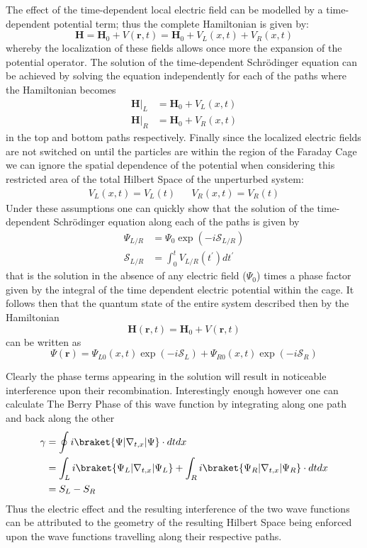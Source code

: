 \documentclass{article}
\begin{document}
The effect of the time-dependent local electric field can be modelled by a time-dependent potential term; thus the complete Hamiltonian is given by:
\begin{equation*}
  \bm{H} = \bm{H}_{0} + V(\bm{r}, t) = \bm{H}_{0} + V_{L}(x,t) + V_{R}(x,t)
\end{equation*}
whereby the localization of these fields allows once more the expansion of the potential operator. The solution of the time-dependent Schrödinger equation can be achieved by solving the equation independently for each of the paths where the Hamiltonian becomes
\begin{align*}
  \bm{H}|_{L} &= \bm{H}_{0} + V_{L}(x,t)\\
  \bm{H}|_{R} &= \bm{H}_{0} + V_{R}(x,t)
\end{align*}
in the top and bottom paths respectively. Finally since the localized electric fields are not switched on until the particles are within the region of the Faraday Cage we can ignore the spatial dependence of the potential when considering this restricted area of the total Hilbert Space of the unperturbed system:
\begin{align*}
  V_{L}(x, t) = V_{L}(t) && V_{R}(x,t) = V_{R}(t)
\end{align*}
Under these assumptions one can quickly show that the solution of the time-dependent Schrödinger equation along each of the paths is given by
\begin{align*}
  \Psi_{L/R} &= \Psi_{0} \exp(-i \mathcal{S}_{L/R})\\
  \mathcal{S}_{L/R} &= \int_{0}^{t} V_{L/R}(t^{\prime}) dt^{\prime} 
\end{align*}
that is the solution in the absence of any electric field ($\Psi_{0}$) times a phase factor given by the integral of the time dependent electric potential within the cage. It follows then that the quantum state of the entire system described then by the Hamiltonian
  \begin{equation*}
    \bm{H}(\bm{r}, t) = \bm{H}_{0} + V(\bm{r}, t)
  \end{equation*}
can be written as
\begin{equation*}
  \Psi(\bm{r})=\Psi_{L0}(x,t)\exp(-i \mathcal{S}_{L}) + \Psi_{R0}(x,t)\exp(-i \mathcal{S}_{R})
\end{equation*}

Clearly the phase terms appearing in the solution will result in noticeable interference upon their recombination. Interestingly enough however one can calculate The Berry Phase of this wave function by integrating along one path and back along the other
\begin{align*}
  \gamma &= \oint i\braket{\Psi|\nabla_{t,x}|\Psi} \cdot dtdx\\
         &= \int_{L} i\braket{\Psi_{L}|\nabla_{t,x}|\Psi_{L}} + \int_{R} i\braket{\Psi_{R}|\nabla_{t,x}|\Psi_{R}} \cdot dtdx\\
         &= S_{L} - S_{R}
\end{align*}
Thus the electric effect and the resulting interference of the two wave functions can be attributed to the geometry of the resulting Hilbert Space being enforced upon the wave functions travelling along their respective paths.
\end{document}

